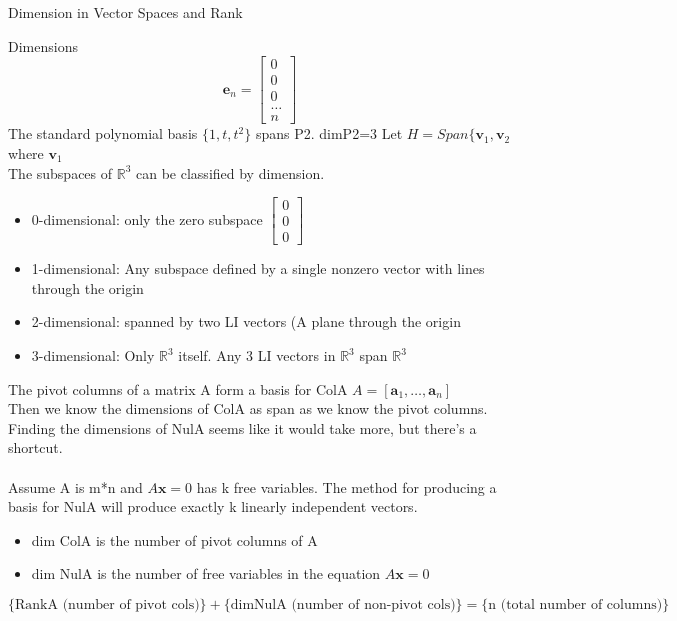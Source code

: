 \documentclass[a4paper, 12pt]{article}
\begin{document}
\begin{section}{Dimension in Vector Spaces and Rank}
\begin{subsection}{Dimensions}
\begin{equation}
\textbf{e}_{n}= \begin{bmatrix} 0\\ 0\\ 0\\ \dots \\ n \end{bmatrix}
\end{equation}
The standard polynomial basis $\{1,t,t^{2}\}$ spans P2. dimP2=3
Let $H=Span\{\textbf{v}_1,\textbf{v}_2$ where $\textbf{v}_{1}$\\
The subspaces of $\mathbb{R}^{3}$ can be classified by dimension.\\
\begin{itemize}
\item{0-dimensional: only the zero subspace
$\begin{bmatrix} 0\\ 0\\ 0 \end{bmatrix}$ }
\item{1-dimensional: Any subspace defined by a single nonzero vector
	with lines through the origin}
\item{2-dimensional: spanned by two LI vectors (A plane through the 
	origin}
\item{3-dimensional: Only $\mathbb{R}^{3}$ itself. Any 3 LI vectors 
in $\mathbb{R}^{3}$ span $\mathbb{R}^{3}$}
\end{itemize}
The pivot columns of a matrix A form a basis for ColA $A=[ \textbf{a}_{1}, \dots, 
\textbf{a}_{n}]$ \\
Then we know the dimensions of ColA as span as we know the pivot columns. Finding the 
dimensions of NulA seems like it would take more, but there's a shortcut. \\ \\
Assume A is m*n and $A\textbf{x}=0$ has k free variables. The method for producing a
basis for NulA will produce exactly k linearly independent vectors.\\
\begin{itemize}
\item{dim ColA is the number of pivot columns of A}
\item{dim NulA is the number of free variables in the equation $A\textbf{x}=0$}
\end{itemize}
\begin{equation}
\{\mbox{RankA (number of pivot cols)}\} + \{\mbox{dimNulA (number of non-pivot cols)}\}
=\{\mbox{n (total number of columns)}\}
\end{equation}
\end{subsection}

\end{section}
\end{document}
